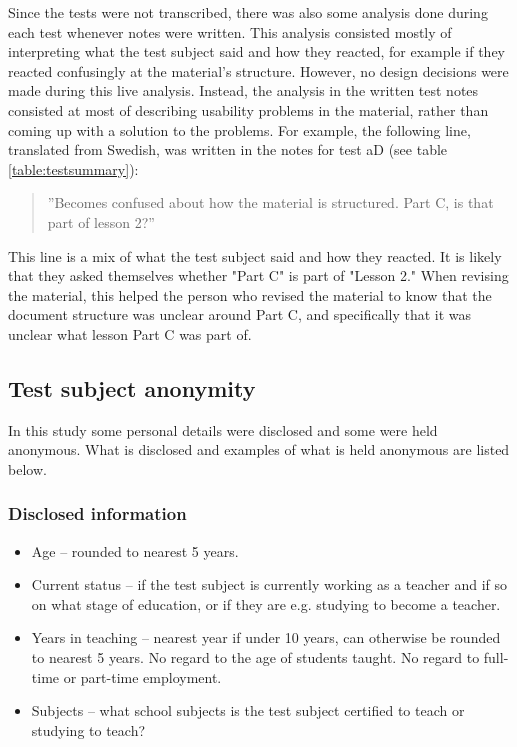 Since the tests were not transcribed, there was also some analysis done during each test whenever notes were written. This analysis consisted mostly of interpreting what the test subject said and how they reacted, for example if they reacted confusingly at the material's structure. However, no design decisions were made during this live analysis. Instead, the analysis in the written test notes consisted at most of describing usability problems in the material, rather than coming up with a solution to the problems. For example, the following line, translated from Swedish, was written in the notes for test aD (see table \ref{table:testsummary}):

\begin{quote}
  ''Becomes confused about how the material is structured. Part C, is that part of lesson 2?''
\end{quote}

This line is a mix of what the test subject said and how they reacted. It is likely that they asked themselves whether "Part C" is part of "Lesson 2." When revising the material, this helped the person who revised the material to know that the document structure was unclear around Part C, and specifically that it was unclear what lesson Part C was part of.

\subsection{Test subject anonymity} \label{subjectanonymity}
In this study some personal details were disclosed and some were held anonymous. What is disclosed and examples of what is held anonymous are listed below. \vspace{-0.2cm}

\subsubsection*{Disclosed information}\vspace{-0.2cm}
    \begin{itemize} %
    \item Age – rounded to nearest 5 years.
    \item Current status – if the test subject is currently working as a teacher and if so on what stage of education, or if they are e.g. studying to become a teacher.
    \item Years in teaching – nearest year if under 10 years, can otherwise be rounded to nearest 5 years. No regard to the age of students taught. No regard to full-time or part-time employment.
    \item Subjects – what school subjects is the test subject certified to teach or studying to teach?
\end{itemize}

